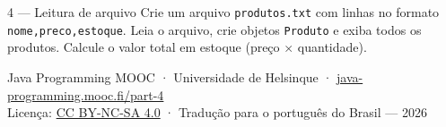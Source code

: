 \documentclass[12pt, a4paper]{article}
\newcommand{\code}[1]{\texttt{\color{javaDeep}#1}}
\begin{document}
\begin{exercicio}{4 --- Leitura de arquivo}
Crie um arquivo \code{produtos.txt} com linhas no formato \code{nome,preco,estoque}.
Leia o arquivo, crie objetos \code{Produto} e exiba todos os produtos. Calcule o valor total em estoque (preço $\times$ quantidade).
\end{exercicio}

\vfill
\begin{center}
  \small\color{gray}
  Java Programming MOOC · Universidade de Helsinque ·
  \href{https://java-programming.mooc.fi/part-4}{java-programming.mooc.fi/part-4}\\
  Licença: \href{https://creativecommons.org/licenses/by-nc-sa/4.0/}{CC BY-NC-SA 4.0} ·
  Tradução para o português do Brasil --- 2026
\end{center}
\end{document}
